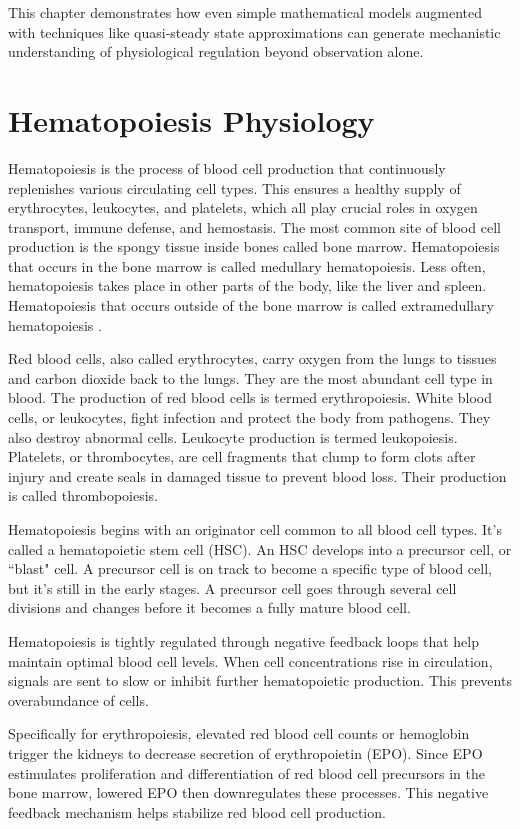This chapter demonstrates how even simple mathematical models augmented with techniques like quasi-steady state approximations can generate mechanistic understanding of physiological regulation beyond observation alone.
\section{Hematopoiesis Physiology}

Hematopoiesis is the process of blood cell production that continuously replenishes various circulating cell types. This ensures a healthy supply of erythrocytes, leukocytes, and platelets, which all play crucial roles in oxygen transport, immune defense, and hemostasis.
The most common site of blood cell production is the spongy tissue inside bones called bone marrow. Hematopoiesis that occurs in the bone marrow is called medullary hematopoiesis. Less often, hematopoiesis takes place in other parts of the body, like the liver and spleen. Hematopoiesis that occurs outside of the bone marrow is called extramedullary hematopoiesis \citep{Jaffe2024}.

Red blood cells, also called erythrocytes, carry oxygen from the lungs to tissues and carbon dioxide back to the lungs. They are the most abundant cell type in blood. The production of red blood cells is termed erythropoiesis. White blood cells, or leukocytes, fight infection and protect the body from pathogens. They also destroy abnormal cells. Leukocyte production is termed leukopoiesis. Platelets, or thrombocytes, are cell fragments that clump to form clots after injury and create seals in damaged tissue to prevent blood loss. Their production is called thrombopoiesis.

Hematopoiesis begins with an originator cell common to all blood cell types. It's called a hematopoietic stem cell (HSC). An HSC develops into a precursor cell, or ``blast" cell. A precursor cell is on track to become a specific type of blood cell, but it's still in the early stages. A precursor cell goes through several cell divisions and changes before it becomes a fully mature blood cell.

Hematopoiesis is tightly regulated through negative feedback loops that help maintain optimal blood cell levels. When cell concentrations rise in circulation, signals are sent to slow or inhibit further hematopoietic production. This prevents overabundance of cells.

Specifically for erythropoiesis, elevated red blood cell counts or hemoglobin trigger the kidneys to decrease secretion of erythropoietin (EPO). Since EPO estimulates proliferation and differentiation of red blood cell precursors in the bone marrow, lowered EPO then downregulates these processes. This negative feedback mechanism helps stabilize red blood cell production.


